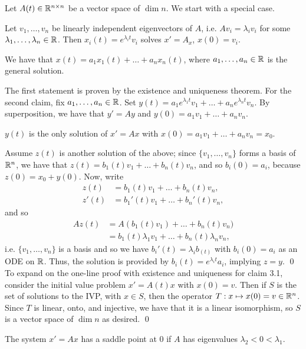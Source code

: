 \noindent Let $A(t) \in \mathbb R^{n \times n}$ be a vector space of $\dim n$. We start with a special case. 
\begin{simpleclaim}
    Let $v_1, \dots, v_n$ be linearly independent eigenvectors of $A$, i.e. $A v_i = \lambda_i v_i$ for some $\lambda_1, \dots, \lambda_n \in \mathbb R$. Then $x_i(t) = e^{\lambda_i t} v_i$ solves $x' = A_x$, $x(0) = v_i$.
\end{simpleclaim}
\begin{simpleclaim}
    We have that $x(t) = a_1x_1(t) + \dots + a_nx_n(t)$, where $a_1, \dots, a_n \in \mathbb R$ is the general solution.
\end{simpleclaim}
\noindent The first statement is proven by the existence and uniqueness theorem. For the second claim, fix $a_1, \dots, a_n \in \mathbb R$. Set $y(t) = a_1 e^{\lambda_1 t} v_1 + \dots + a_n e^{\lambda_n t} v_n$. By superposition, we have that $y' = Ay$ and $y(0) = a_1v_1 + \dots + a_nv_n$.
\begin{simpleclaim}
    $y(t)$ is the only solution of $x' = Ax$ with $x(0) = a_1v_1 + \dots + a_nv_n = x_0$.
\end{simpleclaim}
\noindent Assume $z(t)$ is another solution of the above; since $\{v_1, \dots, v_n\}$ forms a basis of $\mathbb R^n$, we have that $z(t) = b_1(t) v_1 + \dots + b_n(t) v_n$, and so $b_i(0) = a_i$, because $z(0) = x_0 + y(0)$. Now, write
\begin{align*}
    z(t) &= b_1(t) v_1 + \dots + b_n(t) v_n, \\
    z'(t) &= b_1'(t)v_1 + \dots + b_n'(t)v_n,
\end{align*}
and so
\begin{align*}
    Az(t) &= A(b_1(t)v_1) + \dots + b_n(t)v_n) \\
    &= b_1(t)\lambda_1v_1 + \dots + b_n(t)\lambda_nv_n,
\end{align*}
i.e. $\{v_1, \dots, v_n\}$ is a basis and so we have $b_i'(t) = \lambda_i b_(t)$ with $b_i(0) = a_i$ as an ODE on $\mathbb R$. Thus, the solution is provided by $b_i(t) = e^{\lambda_i t} a_i$, implying $z = y$. \qed
\medskip\newline
To expand on the one-line proof with existence and uniqueness for claim 3.1, consider the initial value problem $x' = A(t) x$ with $x(0) = v$. Then if $S$ is the set of solutions to the IVP, with $x \in S$, then the operator $T : x \mapsto x(0) = v \in \mathbb R^n$. Since $T$ is linear, onto, and injective, we have that it is a linear isomorphism, so $S$ is a vector space of $\dim n$ as desired. \qed
\begin{definition}
    The system $x' = Ax$ has a saddle point at $0$ if $A$ has eigenvalues $\lambda_2 < 0 < \lambda_1$.
\end{definition}
